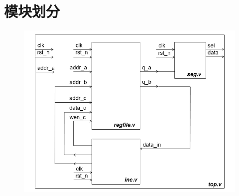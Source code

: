 \documentclass[UTF8]{ctexart}
\begin{document}
\section{模块划分}
\begin{figure}[H]
  \centering
  \includegraphics[width=1\textwidth]{module.png}
\end{figure}
\end{document}
